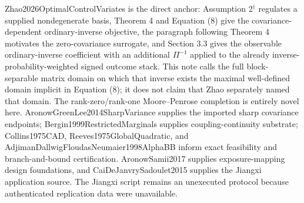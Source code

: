 Zhao2026OptimalControlVariates is the direct anchor: Assumption 2\(^{\dagger}\) regulates a supplied nondegenerate basis, Theorem 4 and Equation (8) give the covariance-dependent ordinary-inverse objective, the paragraph following Theorem 4 motivates the zero-covariance surrogate, and Section 3.3 gives the observable ordinary-inverse coefficient with an additional \(\Pi^{-1}\) applied to the already inverse-probability-weighted signed outcome stack.  This note calls the full block-separable matrix domain on which that inverse exists the maximal well-defined domain implicit in Equation (8); it does not claim that Zhao separately named that domain.  The rank-zero/rank-one Moore--Penrose completion is entirely novel here.  AronowGreenLee2014SharpVariance supplies the imported sharp covariance endpoints; Bergin1999RestrictedMarginals supplies coupling-continuity substrate; Collins1975CAD, Reeves1975GlobalQuadratic, and AdjimanDallwigFloudasNeumaier1998AlphaBB inform exact feasibility and branch-and-bound certification.  AronowSamii2017 supplies exposure-mapping design foundations, and CaiDeJanvrySadoulet2015 supplies the Jiangxi application source.  The Jiangxi script remains an unexecuted protocol because authenticated replication data were unavailable.
